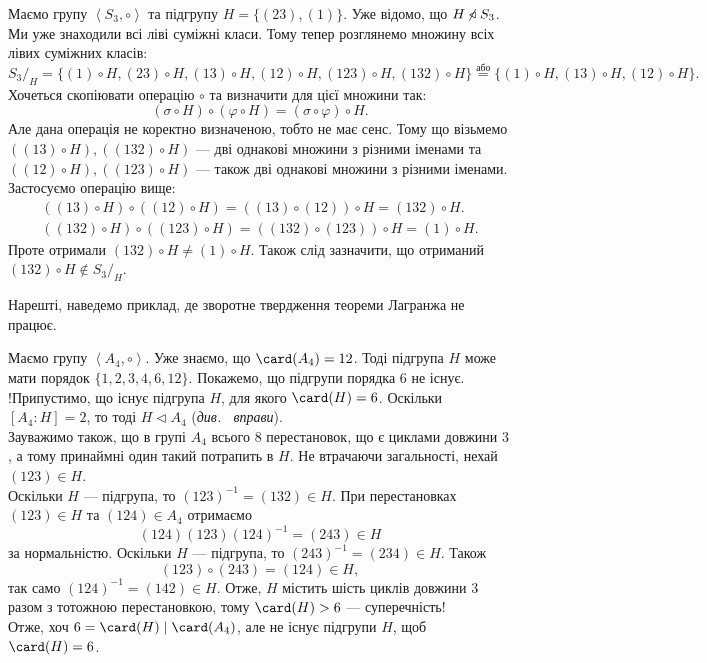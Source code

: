 \documentclass{math_library}
\begin{document}
\begin{example}
Маємо групу $\left<S_3, \circ \right>$ та підгрупу $H = \{(23), (1)\}$. Уже відомо, що $H \centernot\triangleleft S_3$. Ми уже знаходили всі ліві суміжні класи. Тому тепер розглянемо множину всіх лівих суміжних класів:
\[
{S_3}/_H = \{ (1) \circ H, (23) \circ H, (13) \circ H, (12) \circ H, (123)\circ H, (132) \circ H \} \overset{\text{або}}{=} \{ (1) \circ H, (13) \circ H, (12) \circ H \}.
\]
Хочеться скопіювати операцію $\circ$ та визначити для цієї множини так:
\[
(\sigma \circ H) \circ (\varphi \circ H) = (\sigma \circ \varphi) \circ H.
\]
Але дана операція не коректно визначеною, тобто не має сенс. Тому що візьмемо $((13) \circ H), ( (132)\circ H)$ --- дві однакові множини з різними іменами та $( (12) \circ H), ( (123) \circ H)$ --- також дві однакові множини з різними іменами. Застосуємо операцію вище:
\begin{align*}
((13) \circ H) \circ ((12)\circ H) = ((13)\circ (12)) \circ H = (132) \circ H. \\
((132) \circ H) \circ ((123) \circ H) = ((132) \circ (123)) \circ H = (1) \circ H.
\end{align*}
Проте отримали $(132) \circ H \neq (1) \circ H$. Також слід зазначити, що отриманий $(132) \circ H \notin S_3/_H$.
\end{example}

\begin{remark}
Нарешті, наведемо приклад, де зворотне твердження теореми Лагранжа не працює.
\end{remark}

\begin{example} Маємо групу $\left< A_4, \circ \right>$. Уже знаємо, що $\card(A_4) = 12$. Тоді підгрупа $H$ може мати порядок $\{1,2,3,4,6,12\}$. Покажемо, що підгрупи порядка $6$ не існує.\\
!Припустимо, що існує підгрупа $H$, для якого $\card(H) = 6$. Оскільки $[A_4 : H] = 2$, то тоді $H \triangleleft A_4$ (\textit{див.~ вправи}).\\
Зауважимо також, що в групі $A_4$ всього $8$ перестановок, що є циклами довжини $3$, а тому принаймні один такий потрапить в $H$. Не втрачаючи загальності, нехай $(123) \in H$. \\
Оскільки $H$ --- підгрупа, то $(123)^{-1} = (132) \in H$. При перестановках $(123) \in H$ та $(124) \in A_4$ отримаємо 
\[
(124) (123) (124)^{-1} = (243) \in H
\]
за нормальністю. Оскільки $H$ --- підгрупа, то $(243)^{-1} = (234) \in H$. Також 
\[
(123) \circ (243) = (124) \in H,
\]
так само $(124)^{-1} = (142) \in H$. Отже, $H$ містить шість циклів довжини $3$ разом з тотожною перестановкою, тому $\card(H) > 6$ --- суперечність!\\
Отже, хоч $6 = \card(H) \mid \card(A_4)$, але не існує підгрупи $H$, щоб $\card(H) = 6$.
\end{example}
\end{document}
